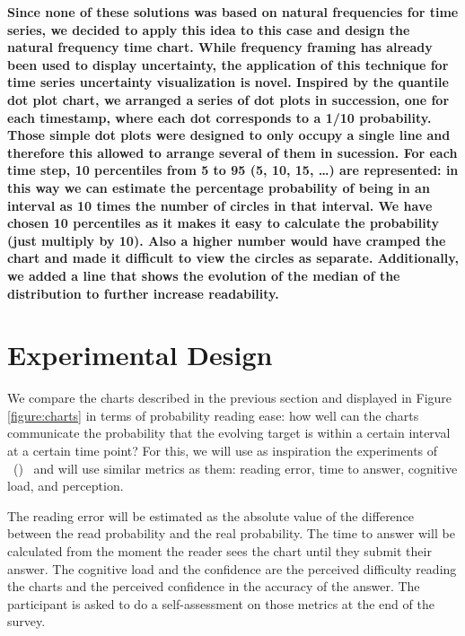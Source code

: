 \documentclass[a4paper,3p,sort&compress]{elsarticle}
\DeclareRobustCommand{\citeextp}[1]{\citeauthor{#1}~(\citeyear{#1})~\cite{#1}}
\begin{document}
\textbf{Since none of these solutions was based on natural frequencies for time series,
we decided to apply this idea to this case and design the natural frequency time
chart. While frequency framing has already been used to display uncertainty, the
application of this technique for time series uncertainty visualization is
novel. Inspired by the quantile dot plot chart, we arranged a series of dot plots 
in succession, one for each timestamp, where each dot corresponds to a 
1/10 probability. Those simple dot plots were designed to only occupy a single line 
and therefore this allowed to arrange several of them in sucession. For each time step, 
10 percentiles from 5 to 95
(5, 10, 15, \ldots) are represented: in this way we can estimate
the percentage probability of being in an interval as 10 times the number of
circles in that interval. We have chosen 10 percentiles as it makes it easy to
calculate the probability (just multiply by 10). Also a higher number would have
cramped the chart and made it difficult to view the circles as separate.
Additionally, we added a line that shows the evolution of the median of the distribution 
to further increase readability.}


\section{Experimental Design}
\label{sec:exp_design}

We compare the charts described in the previous section and displayed in Figure
\ref{figure:charts} in terms of probability reading ease: how well can the
charts communicate the probability that the evolving target is within a certain
interval at a certain time point? For this, we will use as inspiration the
experiments of \citeextp{brennen_instrument_2018} and will use
similar metrics as them: reading error, time to answer, cognitive load, and
perception.

The reading error will be estimated as the absolute value of the difference
between the read probability and the real probability. The time to answer will
be calculated from the moment the reader sees the chart until they submit their
answer. The cognitive load and the confidence are the perceived difficulty
reading the charts and the perceived confidence in the accuracy of the answer.
The participant is asked to do a self-assessment on those metrics at the end of
the survey.
\end{document}
